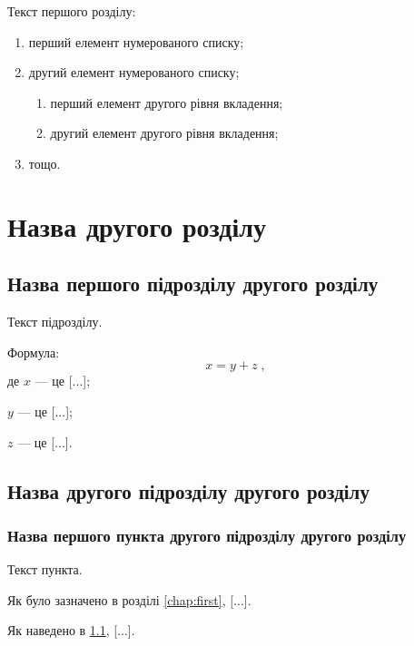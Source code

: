 \documentclass{xedstu}
\begin{document}
Текст першого розділу:
\begin{enumerate}
	\item перший елемент нумерованого списку;
	\item другий елемент нумерованого списку;
	\begin{enumerate}
		\item перший елемент другого рівня вкладення;
		\item другий елемент другого рівня вкладення;
	\end{enumerate}
	\item тощо.
\end{enumerate}

\chapter{Назва другого розділу}
\label{chap:second}

\section{Назва першого підрозділу другого розділу}
\label{sec:secondfirst}

Текст підрозділу.

Формула:
\begin{equation}
x = y + z\;,
\label{eq:equation1}
\end{equation}
де $x$ --- це [...];

$y$ --- це [...];

$z$ --- це [...].

\section{Назва другого підрозділу другого розділу}
\label{sec:secondsecond}

\subsection{Назва першого пункта другого підрозділу другого розділу}
\label{subsec:secondsecondfirst}

Текст пункта.

Як було зазначено в розділі \ref{chap:first}, [...].

Як наведено в \ref{sec:secondfirst}, [...].
\end{document}
